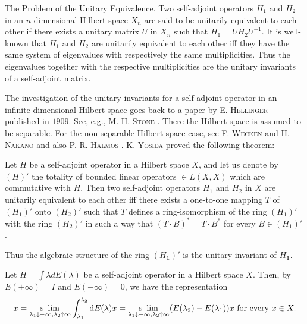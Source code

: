 The Problem of the Unitary Equivalence. Two self-adjoint operators $H_{1}$ and $H_{2}$ in an $n$-dimensional Hilbert space $X_{n}$ are said to be unitarily equivalent to each other if there exists a unitary matrix $U$ in $X_{n}$ such that $H_{1}=UH_{2}U^{-1}$. It is well-known that $H_{1}$ and $H_{2}$ are unitarily equivalent to each other iff they have the same system of eigenvalues with respectively the same multiplicities. Thus the eigenvalues together with the respective multiplicities are the unitary invariants of a self-adjoint matrix. 

The investigation of the unitary invariants for a self-adjoint operator in an infinite dimensional Hilbert space goes back to a paper by E. \textsc{Hellinger} \cite{hausdorff85} published in $1909$. See, e.g., M. H. \textsc{Stone} \cite{stone311}. There the Hilbert space is assumed to be separable. For the non-separable Hilbert space case, see F. \textsc{Wecken} \cite{wecken333} and H. \textsc{Nakano} \cite{nakano224} and also P. R. \textsc{Halmos} \cite{halmos93}. K. \textsc{Yosida} \cite{yosida356} proved the following theorem: 

Let $H$ be a self-adjoint operator in a Hilbert space $X$, and let us denote by $(H)'$ the totality of bounded linear operators $\in L(X, X)$ which are commutative with $H$. Then two self-adjoint operators $H_1$ and $H_2$ in $X$ are unitarily equivalent to each other iff there exists a one-to-one mapping $T$ of $(H_1)'$ onto $(H_2)'$ such that $T$ defines a ring-isomorphism of the ring $(H_1)'$ with the ring $(H_2)'$ in such a way that $(T \cdot B)^* = T \cdot B^*$ for every $B \in (H_1)'$. 

Thus the algebraic structure of the ring $(H_{\mathbf{1}})'$ is the unitary invariant of $H_{\mathbf{1}}$. 


\label{sec:XI.9}

Let $H = \int \lambda dE(\lambda)$ be a self-adjoint operator in a Hilbert space $X$. Then, by $E(+\infty) = I$ and $E(-\infty) = 0$, we have the representation 
\begin{equation}\label{eq:XI.9.1}
x = \underset {\lambda_{1} \downarrow - \infty , \lambda_{2} \uparrow \infty} {\text{s-}\lim} \int_ {\lambda_{1}} ^ {\lambda_{2}} \mathop{}\!\mathrm{d} E (\lambda) x = \underset {\lambda_{1} \downarrow - \infty , \lambda_{2} \uparrow \infty} {\text{s-}\lim} (E (\lambda_{2}) - E (\lambda_{1})) x \text{ for every } x \in X.
\end{equation}

